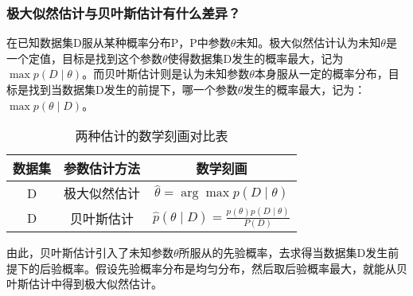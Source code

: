 \subsubsection{极大似然估计与贝叶斯估计有什么差异？}
在已知数据集D服从某种概率分布P，P中参数$\theta $未知。极大似然估计认为未知$\theta $是一个定值，目标是找到这个参数$\theta $使得数据集D发生的概率最大，记为$\max p(D\mid\theta)$。而贝叶斯估计则是认为未知参数$\theta $本身服从一定的概率分布，目标是找到当数据集D发生的前提下，哪一个参数$\theta $发生的概率最大，记为：$\max p(\theta\mid D)$。
\begin{table}[h]
	\centering
	\begin{tabular}{ccc}
		\toprule
		数据集 & 参数估计方法 & 数学刻画 \\
		\midrule
		D & 极大似然估计 & $\hat{\theta} = \arg\max p(D \mid \theta)$ \\
		D & 贝叶斯估计 & $\hat{p}(\theta \mid D) = \frac{p(\theta)p(D \mid \theta)}{P(D)}$ \\
		\bottomrule
	\end{tabular}
	\caption{两种估计的数学刻画对比表}
	\label{tab:estimation_methods}
\end{table}

由此，贝叶斯估计引入了未知参数$\theta $所服从的先验概率，去求得当数据集D发生前提下的后验概率。假设先验概率分布是均匀分布，然后取后验概率最大，就能从贝叶斯估计中得到极大似然估计。